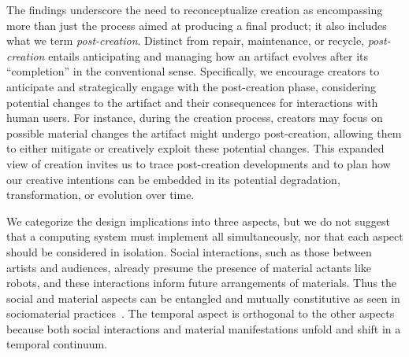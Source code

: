 The findings underscore the need to reconceptualize creation as encompassing more than just the process aimed at producing a final product; it also includes what we term \textit{post-creation}. Distinct from repair, maintenance, or recycle, \textit{post-creation} entails anticipating and managing how an artifact evolves after its ``completion'' in the conventional sense. Specifically, we encourage creators to anticipate and strategically engage with the post-creation phase, considering potential changes to the artifact and their consequences for interactions with human users. For instance, during the creation process, creators may focus on possible material changes the artifact might undergo post-creation, allowing them to either mitigate or creatively exploit these potential changes. This expanded view of creation invites us to trace post-creation developments and to plan how our creative intentions can be embedded in its potential degradation, transformation, or evolution over time.

We categorize the design implications into three aspects, but we do not suggest that a computing system must implement all simultaneously, nor that each aspect should be considered in isolation. Social interactions, such as those between artists and audiences, already presume the presence of material actants like robots, and these interactions inform future arrangements of materials. Thus the social and material aspects can be entangled and mutually constitutive as seen in sociomaterial practices~\cite{orlikowski2007sociomaterial, cheatle2015digital, rosner2012material}. The temporal aspect is orthogonal to the other aspects because both social interactions and material manifestations unfold and shift in a temporal continuum.
